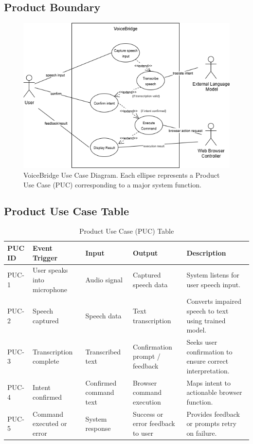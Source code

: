 \documentclass[12pt]{article}
\begin{document}
\subsection{Product Boundary}
\begin{figure}[H]
    \centering
    \includegraphics[width=1.1\textwidth]{..//imgs/VoiceBridge_use_case_diagram.png}
    \caption{VoiceBridge Use Case Diagram. Each ellipse represents a Product Use Case (PUC) corresponding to a major system function.}
    \label{fig:voicebridge-usecase}
\end{figure} 
\subsection{Product Use Case Table}
\begin{table}[H]
\centering
\caption{Product Use Case (PUC) Table}
\begin{tabularx}{\textwidth}{p{1.5cm}p{3cm}p{2.5cm}p{3cm}X}
\toprule
\textbf{PUC ID} & \textbf{Event Trigger} & \textbf{Input} & \textbf{Output} & \textbf{Description} \\
\midrule
PUC-1 & User speaks into microphone & Audio signal & Captured speech data & System listens for user speech input. \\
PUC-2 & Speech captured & Speech data & Text transcription & Converts impaired speech to text using trained model. \\
PUC-3 & Transcription complete & Transcribed text & Confirmation prompt / feedback & Seeks user confirmation to ensure correct interpretation. \\
PUC-4 & Intent confirmed & Confirmed command text & Browser command execution & Maps intent to actionable browser function. \\
PUC-5 & Command executed or error & System response & Success or error feedback to user & Provides feedback or prompts retry on failure. \\
\bottomrule
\end{tabularx}
\end{table}
\end{document}
